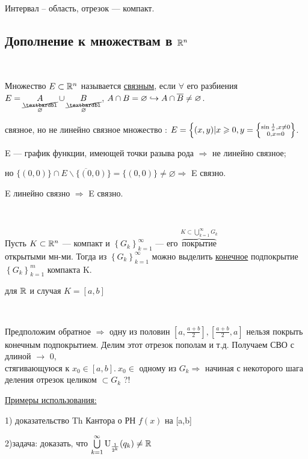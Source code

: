 \Examples Интервал -- область, отрезок --- компакт.

\smallskip

\subsection{Дополнение к множествам в $\mathbb{R}^n$}

 \ \parbox[t]{0.95\linewidth}{\Def Множество $E \subset \mathbb{R}^n$ называется \underline{связным}, если  $\forall$ его разбиения $E=\underset{\substack {\cancel{\textbardbl} \\ \varnothing}}{A} \cup \underset{\substack {\cancel{\textbardbl} \\ \varnothing}}{B}$, $A \cap B = \varnothing \hookrightarrow A \cap \overline{B} \neq \varnothing$.

\Example \parbox[t]{0.95\linewidth}{
	связное, но не линейно связное множество : $E = \Big\{ (x,y) | x \geqslant 0, y = \left\{ 					\substack{\sin{\frac{1}{x}}, x\ne0 \\ 0, x = 0} \right\}$.

	E --- график функции, имеющей точки разыва  рода $\Rightarrow$ не линейно 			связное;

	но $\{(0,0)\} \cap \overline{E \backslash \{(0,0)\}} = \{(0,0)\} \ne \varnothing \Rightarrow$ E 			связно.
}

\smallskip

\Note E линейно связно $\Rightarrow$ E связно.}

 \ \parbox[t]{0.95\linewidth}{   Пусть $K \subset \mathbb{R}^n$ --- компакт и $\left\{ G_k\right\}_{k=1}^\infty$ --- его $\overbrace {\text{покрытие}}^{K \subset \bigcup\limits_{k=1}^{\infty} G_k} $ \\ открытыми мн-ми. Тогда из $\left\{ G_k\right\}_{k=1}^\infty$  можно выделить \underline{конечное} подпокрытие $\left\{ G_k\right\}_{k=1}^m$ компакта K.

\Proof для $\mathbb{R}$  и случая $K = \left[a,b\right]$

~~\parbox[t]{0.95\linewidth}{Предположим обратное $\Rightarrow$ одну из половин $\left[a,\frac{a+b}{2} \right], 
\left[\frac{a+b}{2}, a \right]$ нельзя покрыть \\ конечным подпокрытием. Делим этот отрезок пополам и т.д. Получаем СВО с длиной $\rightarrow$ 0, \\ стягивающуюся к $x_0 \in [a,b]. \ x_0 \in$ одному из $G_k \Rightarrow$ начиная с некоторого шага деления отрезок целиком $\subset G_k$ ?! \Endproof}

\smallskip

\underline{Примеры использования:} \parbox[t]{0.95\linewidth}{
	
1) доказательство Th Кантора о РН $f(x)$ на [a,b]

2)задача: доказать, что $\bigcup\limits_{k=1}^{\infty} \text{U}_{\frac{1}{2^k}} (q_k) \neq \mathbb{R}$ }
} 

